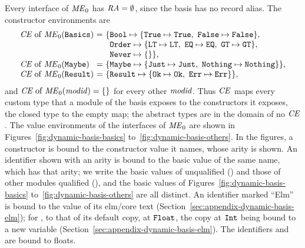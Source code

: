 Every interface of $\mathit{ME}_0$ has $\mathit{RA}=\emptyset$, since the basis has no
record alias. The constructor environments are
\[
\begin{array}{@{}l@{\ =\ }l@{}}
  \dmCE\of\ME_0(\kw{Basics}) &
    \{\kw{Bool}\mapsto\{\kw{True}\mapsto\kw{True},\ \kw{False}\mapsto\kw{False}\},\\
  \multicolumn{1}{l}{} & \phantom{\{}\kw{Order}\mapsto\{\kw{LT}\mapsto\kw{LT},\
    \kw{EQ}\mapsto\kw{EQ},\ \kw{GT}\mapsto\kw{GT}\},\\
  \multicolumn{1}{l}{} & \phantom{\{}\kw{Never}\mapsto\emptymap\},\\
  \dmCE\of\ME_0(\kw{Maybe}) &
    \{\kw{Maybe}\mapsto\{\kw{Just}\mapsto\kw{Just},\ \kw{Nothing}\mapsto\kw{Nothing}\}\},\\
  \dmCE\of\ME_0(\kw{Result}) &
    \{\kw{Result}\mapsto\{\kw{Ok}\mapsto\kw{Ok},\ \kw{Err}\mapsto\kw{Err}\}\},
\end{array}
\]
and $\mathit{CE}\mathrel{\mathrm{of}}\mathit{ME}_0(\mathit{modid})=\{\}$ for every other $\mathit{modid}$. Thus $\mathit{CE}$
maps every custom type that a module of the basis exposes to the constructors
it exposes, the closed type \kw{Never} to the empty map; the abstract types
are in the domain of no $\mathit{CE}$. %
The value environments of the interfaces of $\mathit{ME}_0$ are shown in
Figures~\ref{fig:dynamic-basis-basics} to~\ref{fig:dynamic-basis-others}.
In the figures, a constructor is bound to the constructor value it names,
whose arity is shown. An identifier shown with an arity is bound to the basic
value of the same name, which has that arity; we write the basic values of
\kw{Basics} unqualified (\kw{add}) and those of other modules qualified
(\kw{Debug.log}), and the basic values of
Figures~\ref{fig:dynamic-basis-basics} to~\ref{fig:dynamic-basis-others} are
all distinct. An identifier marked ``Elm'' is bound to the value of its
elm/core text (Section~\ref{sec:appendix-dynamic-basis-elm}); for ,
to that of its default copy, at $\mathtt{Float}$, the copy at $\mathtt{Int}$ being bound to
a new variable (Section~\ref{sec:appendix-dynamic-basis-elm}). %
The identifiers
 and  are bound to floats.

